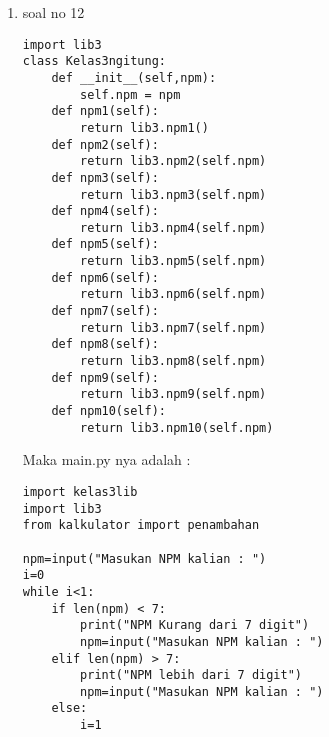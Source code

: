 \begin{enumerate}
\begin{lstlisting}
    a=npm[0]
    b=npm[1]
    c=npm[2]
    d=npm[3]
    e=npm[4]
    f=npm[5]
    g=npm[6]
    conv=1

    for x in a,b,c,d,e,f,g:
        conv*=int(x)
    print(conv)
def npm8(npm):
    a=npm[0]
    b=npm[1]
    c=npm[2]
    d=npm[3]
    e=npm[4]
    f=npm[5]
    g=npm[6]
    for x in a,b,c,d,e,f,g:
        if int(x)%2==0:
            if int(x)==0:
                x=""
            print(x,end ="")
def npm9(npm):
    a=npm[0]
    b=npm[1]
    c=npm[2]
    d=npm[3]
    e=npm[4]
    f=npm[5]
    g=npm[6]
    for x in a,b,c,d,e,f,g:
    
        if int(x)%2==1:
            print(x,end ="")
def npm10(npm):
    a=npm[0]
    b=npm[1]
    c=npm[2]
    d=npm[3]
    e=npm[4]
    f=npm[5]
    g=npm[6]
    for x in a,b,c,d,e,f,g:    
        if int(x) > 1:
            for i in range(2,int(x)):
                if (int(x) % i) == 0:
                    break
            else:
                print(int(x),end =""),
\end{lstlisting}
Maka hasil untuk outputnya adalah : 
\begin{verbatim}
Masukan NPM kalian : 1184021
***   ***   *******   ******  ****** ******  ***
***   ***   **   **  **   **  **  **     **  ***
***   ***    ****   ********  **  ** ******  ***
***   ***   **   **       **  **  ** **      ***
***   ***   *******       **  ****** ******  ***

Halo, 021 apa kabar ?
Halo, 021 apa kabar ?
Halo, 021 apa kabar ?
3
\end{verbatim}
\item soal no 12
\begin{lstlisting}
import lib3
class Kelas3ngitung:
    def __init__(self,npm):
        self.npm = npm
    def npm1(self):
        return lib3.npm1()
    def npm2(self):
        return lib3.npm2(self.npm)
    def npm3(self):
        return lib3.npm3(self.npm)
    def npm4(self):
        return lib3.npm4(self.npm)
    def npm5(self):
        return lib3.npm5(self.npm)
    def npm6(self):
        return lib3.npm6(self.npm)
    def npm7(self):
        return lib3.npm7(self.npm)
    def npm8(self):
        return lib3.npm8(self.npm)
    def npm9(self):
        return lib3.npm9(self.npm)
    def npm10(self):
        return lib3.npm10(self.npm)
\end{lstlisting}
Maka main.py nya adalah :
\begin{lstlisting}
import kelas3lib
import lib3
from kalkulator import penambahan
   
npm=input("Masukan NPM kalian : ")
i=0
while i<1:
    if len(npm) < 7:
        print("NPM Kurang dari 7 digit")
        npm=input("Masukan NPM kalian : ")
    elif len(npm) > 7:
        print("NPM lebih dari 7 digit")
        npm=input("Masukan NPM kalian : ")
    else:
        i=1


\end{lstlisting}
\end{enumerate}
